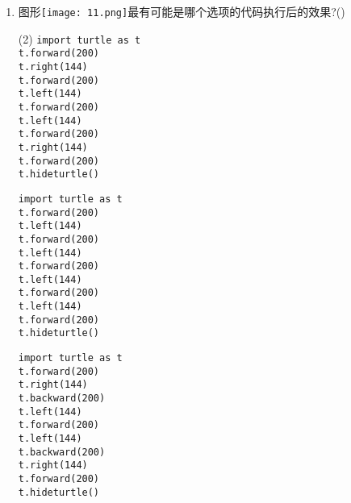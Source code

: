 \documentclass[11pt]{ctexart}
\begin{document}
\begin{enumerate}
        \item 图形\texttt{[image: 11.png]}最有可能是哪个选项的代码执行后的效果?(\qquad)
        \begin{tasks}(2)
            \task \lstinline{import turtle as t}\\
            \lstinline{t.forward(200)}\\
            \lstinline{t.right(144)}\\
            \lstinline{t.forward(200)}\\
            \lstinline{t.left(144)}\\
            \lstinline{t.forward(200)}\\
            \lstinline{t.left(144)}\\
            \lstinline{t.forward(200)}\\
            \lstinline{t.right(144)}\\
            \lstinline{t.forward(200)}\\
            \lstinline{t.hideturtle()}

            \task \lstinline{import turtle as t}\\
            \lstinline{t.forward(200)}\\
            \lstinline{t.left(144)}\\
            \lstinline{t.forward(200)}\\
            \lstinline{t.left(144)}\\
            \lstinline{t.forward(200)}\\
            \lstinline{t.left(144)}\\
            \lstinline{t.forward(200)}\\
            \lstinline{t.left(144)}\\
            \lstinline{t.forward(200)}\\
            \lstinline{t.hideturtle()}

            \task \lstinline{import turtle as t}\\
            \lstinline{t.forward(200)}\\
            \lstinline{t.right(144)}\\
            \lstinline{t.backward(200)}\\
            \lstinline{t.left(144)}\\
            \lstinline{t.forward(200)}\\
            \lstinline{t.left(144)}\\
            \lstinline{t.backward(200)}\\
            \lstinline{t.right(144)}\\
            \lstinline{t.forward(200)}\\
            \lstinline{t.hideturtle()}


\end{tasks}
\end{enumerate}
\end{document}
